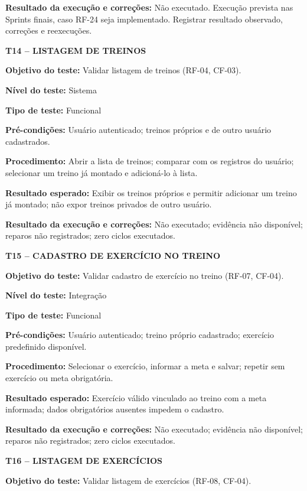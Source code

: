 \noindent\textbf{Resultado da execução e correções:} Não executado. Execução prevista nas Sprints finais, caso RF-24 seja implementado. Registrar resultado observado, correções e reexecuções.

\textbf{T14 -- LISTAGEM DE TREINOS}

\noindent\textbf{Objetivo do teste:} Validar listagem de treinos (RF-04, CF-03).

\noindent\textbf{Nível do teste:} Sistema

\noindent\textbf{Tipo de teste:} Funcional

\noindent\textbf{Pré-condições:} Usuário autenticado; treinos próprios e de outro usuário cadastrados.

\noindent\textbf{Procedimento:} Abrir a lista de treinos; comparar com os registros do usuário; selecionar um treino já montado e adicioná-lo à lista.

\noindent\textbf{Resultado esperado:} Exibir os treinos próprios e permitir adicionar um treino já montado; não expor treinos privados de outro usuário.

\noindent\textbf{Resultado da execução e correções:} Não executado; evidência não disponível; reparos não registrados; zero ciclos executados.

\textbf{T15 -- CADASTRO DE EXERCÍCIO NO TREINO}

\noindent\textbf{Objetivo do teste:} Validar cadastro de exercício no treino (RF-07, CF-04).

\noindent\textbf{Nível do teste:} Integração

\noindent\textbf{Tipo de teste:} Funcional

\noindent\textbf{Pré-condições:} Usuário autenticado; treino próprio cadastrado; exercício predefinido disponível.

\noindent\textbf{Procedimento:} Selecionar o exercício, informar a meta e salvar; repetir sem exercício ou meta obrigatória.

\noindent\textbf{Resultado esperado:} Exercício válido vinculado ao treino com a meta informada; dados obrigatórios ausentes impedem o cadastro.

\noindent\textbf{Resultado da execução e correções:} Não executado; evidência não disponível; reparos não registrados; zero ciclos executados.

\textbf{T16 -- LISTAGEM DE EXERCÍCIOS}

\noindent\textbf{Objetivo do teste:} Validar listagem de exercícios (RF-08, CF-04).

